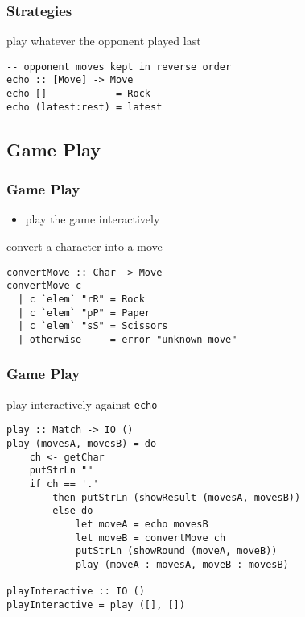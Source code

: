 \documentclass[dvipsnames]{beamer}
\theoremstyle{plain}
\begin{document}
\begin{frame}[fragile]
  \frametitle{Strategies}

  \begin{exampleblock}{play whatever the opponent played last}
    \begin{lstlisting}
-- opponent moves kept in reverse order
echo :: [Move] -> Move
echo []            = Rock
echo (latest:rest) = latest
    \end{lstlisting}
  \end{exampleblock}
\end{frame}

\subsection{Game Play}

\begin{frame}[fragile]
  \frametitle{Game Play}

  \begin{itemize}
    \item play the game interactively
  \end{itemize}

  \begin{exampleblock}{convert a character into a move}
    \begin{lstlisting}
convertMove :: Char -> Move
convertMove c
  | c `elem` "rR" = Rock
  | c `elem` "pP" = Paper
  | c `elem` "sS" = Scissors
  | otherwise     = error "unknown move"
    \end{lstlisting}
  \end{exampleblock}
\end{frame}

\begin{frame}[fragile]
  \frametitle{Game Play}

  \begin{exampleblock}{play interactively against \lstinline|echo|}
    \begin{lstlisting}
play :: Match -> IO ()
play (movesA, movesB) = do
    ch <- getChar
    putStrLn ""
    if ch == '.'
        then putStrLn (showResult (movesA, movesB))
        else do
            let moveA = echo movesB
            let moveB = convertMove ch
            putStrLn (showRound (moveA, moveB))
            play (moveA : movesA, moveB : movesB)

playInteractive :: IO ()
playInteractive = play ([], [])
    \end{lstlisting}
  \end{exampleblock}
\end{frame}
\end{document}
